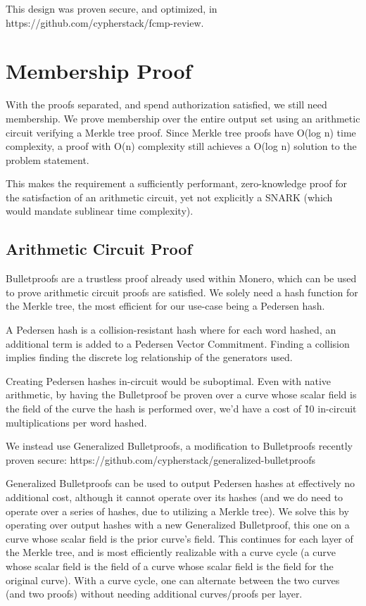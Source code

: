 \documentclass[]{article}
\begin{document}
This design was proven secure, and optimized, in https://github.com/cypherstack/fcmp-review.

\section{Membership Proof}

With the proofs separated, and spend authorization satisfied, we still need membership. We prove membership over the entire output set using an arithmetic circuit verifying a Merkle tree proof. Since Merkle tree proofs have O(log n) time complexity, a proof with O(n) complexity still achieves a O(log n) solution to the problem statement.

This makes the requirement a sufficiently performant, zero-knowledge proof for the satisfaction of an arithmetic circuit, yet not explicitly a SNARK (which would mandate sublinear time complexity).

\subsection{Arithmetic Circuit Proof}

Bulletproofs are a trustless proof already used within Monero, which can be used to prove arithmetic circuit proofs are satisfied. We solely need a hash function for the Merkle tree, the most efficient for our use-case being a Pedersen hash.

A Pedersen hash is a collision-resistant hash where for each word hashed, an additional term is added to a Pedersen Vector Commitment. Finding a collision implies finding the discrete log relationship of the generators used.

Creating Pedersen hashes in-circuit would be suboptimal. Even with native arithmetic, by having the Bulletproof be proven over a curve whose scalar field is the field of the curve the hash is performed over, we'd have a cost of \~10 in-circuit multiplications per word hashed.

We instead use Generalized Bulletproofs, a modification to Bulletproofs recently proven secure: https://github.com/cypherstack/generalized-bulletproofs

Generalized Bulletproofs can be used to output Pedersen hashes at effectively no additional cost, although it cannot operate over its hashes (and we do need to operate over a series of hashes, due to utilizing a Merkle tree). We solve this by operating over output hashes with a new Generalized Bulletproof, this one on a curve whose scalar field is the prior curve's field. This continues for each layer of the Merkle tree, and is most efficiently realizable with a curve cycle (a curve whose scalar field is the field of a curve whose scalar field is the field for the original curve). With a curve cycle, one can alternate between the two curves (and two proofs) without needing additional curves/proofs per layer.
\end{document}
